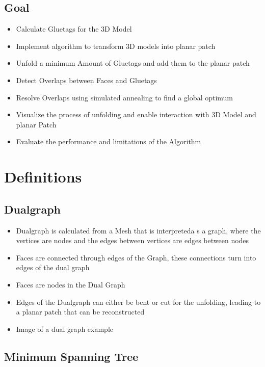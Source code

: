 \documentclass[draft,final]{vutinfth} %
\begin{document}
\section{Goal}

\begin{itemize}
	\item Calculate Gluetags for the 3D Model
	\item Implement algorithm to transform 3D models into planar patch
	\item Unfold a minimum Amount of Gluetags and add them to the planar patch
	\item Detect Overlaps between Faces and Gluetags
	\item Resolve Overlaps using simulated annealing to find a global optimum
	\item Visualize the process of unfolding and enable interaction with 3D Model and planar Patch
	\item Evaluate the performance and limitations of the Algorithm
\end{itemize}

\chapter{Definitions}

\section{Dualgraph}

\begin{itemize}
	\item Dualgraph is calculated from a Mesh that is interpreteda s a graph, where the vertices are nodes and the edges between vertices are edges between nodes
	\item Faces are connected through edges of the Graph, these connections turn into edges of the dual graph
	\item Faces are nodes in the Dual Graph
	\item Edges of the Dualgraph can either be bent or cut for the unfolding, leading to a planar patch that can be reconstructed
	\item Image of a dual graph example
\end{itemize}

\section{Minimum Spanning Tree}
\end{document}
